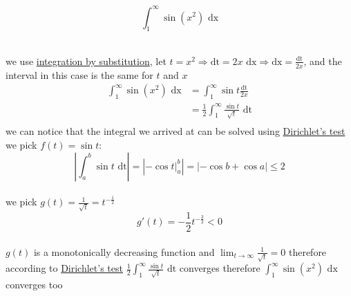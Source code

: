 \documentclass[a4paper,12pt]{article}
\newcommand{\?}{\stackrel{?}{=}}
\begin{document}
\begin{definition}
\begin{question}
\[
  \int_1^\infty \sin(x^2) \text{ dx}
\]\\[0pt]
\begin{answer}
we use \hyperref[sec:orgf2294be]{integration by substitution}, let \(t = x^2 \Longrightarrow \text{dt} = 2x\text{ dx} \Longrightarrow \text{dx} = \frac{\text{dt}}{2x}\), and the interval in this case is the same for \(t\) and \(x\)\\[0pt]
\begin{align*}
  \int_1^\infty \sin(x^2) \text{ dx} &= \int_1^\infty \sin t \frac{\text{dt}}{2x}\\
  &= \frac12\int_1^\infty \frac{\sin t}{\sqrt{t}} \text{ dt}\\
\end{align*}
we can notice that the integral we arrived at can be solved using \hyperref[sec:org6f3d3ae]{Dirichlet's test}\\[0pt]
we pick \(f(t) = \sin t\):\\[0pt]
\[
  \left|\int_a^b \sin t \text{ dt}\right| = \left|-\cos t\big|_a^b\right| = |-\cos b + \cos a| \leq 2
\]\\[0pt]
we pick \(g(t) = \frac{1}{\sqrt{t}} = t^{-\frac12}\)\\[0pt]
\[
  g'(t) = -\frac12 t^{-\frac32} < 0
\]\\[0pt]
\(g(t)\) is a monotonically decreasing function and \(\lim_{t\to\infty} \frac{1}{\sqrt t} = 0\) therefore according to \hyperref[sec:org6f3d3ae]{Dirichlet's test} \(\frac12\int_1^\infty \frac{\sin t}{\sqrt{t}} \text{ dt}\) converges therefore \(\int_1^\infty \sin(x^2) \text{ dx}\) converges too\\[0pt]
\end{answer}
\end{question}


\end{definition}
\end{document}

